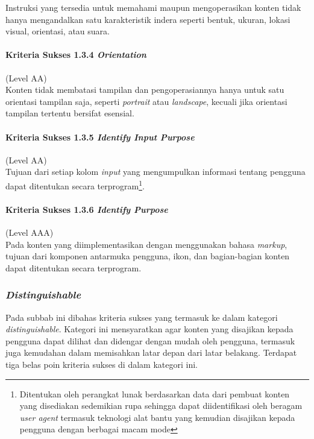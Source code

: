 Instruksi yang tersedia untuk memahami maupun mengoperasikan konten tidak hanya mengandalkan satu karakteristik indera seperti bentuk, ukuran, lokasi visual, orientasi, atau suara.

\paragraph{Kriteria Sukses 1.3.4 \textit{Orientation}}
\label{sec:kriteria_sukses_1.3.4}
(Level AA)\\

Konten tidak membatasi tampilan dan pengoperasiannya hanya untuk satu orientasi tampilan saja, seperti \textit{portrait} atau \textit{landscape}, kecuali jika orientasi tampilan tertentu bersifat esensial.

\paragraph{Kriteria Sukses 1.3.5 \textit{Identify Input Purpose}}
\label{sec:kriteria_sukses_1.3.5}
(Level AA)\\

Tujuan dari setiap kolom \textit{input} yang mengumpulkan informasi tentang pengguna dapat ditentukan secara terprogram\footnote{Ditentukan oleh perangkat lunak berdasarkan data dari pembuat konten yang disediakan sedemikian rupa sehingga dapat diidentifikasi oleh beragam \textit{user agent} termasuk teknologi alat bantu yang kemudian disajikan kepada pengguna dengan berbagai macam mode}.

\paragraph{Kriteria Sukses 1.3.6 \textit{Identify Purpose}}
\label{sec:kriteria_sukses_1.3.6}
(Level AAA)\\

Pada konten yang diimplementasikan dengan menggunakan bahasa \textit{markup}, tujuan dari komponen antarmuka pengguna, ikon, dan bagian-bagian konten dapat ditentukan secara terprogram.

\subsubsection{\textit{Distinguishable}}
\label{sec:distinguishable}
Pada subbab ini dibahas kriteria sukses yang termasuk ke dalam kategori \textit{distinguishable}. Kategori ini mensyaratkan agar konten yang disajikan kepada pengguna dapat dilihat dan didengar dengan mudah oleh pengguna, termasuk juga kemudahan dalam memisahkan latar depan dari latar belakang. Terdapat tiga belas poin kriteria sukses di dalam kategori ini.

